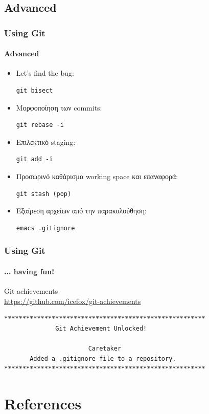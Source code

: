 \documentclass[]{beamer}
\begin{document}
\subsection{Advanced}

\begin{frame}[fragile]
  \frametitle{Using Git}
  \framesubtitle{Advanced}
  \begin{itemize}
    \item Let's find the bug:
\begin{verbatim}
git bisect
\end{verbatim}\pause
    \item Μορφοποίηση των commits:
\begin{verbatim}
git rebase -i
\end{verbatim}\pause
    \item Επιλεκτικό staging:
\begin{verbatim}
git add -i
\end{verbatim}\pause
    \item Προσωρινό καθάρισμα working space και επαναφορά:
\begin{verbatim}
git stash (pop)
\end{verbatim}\pause
    \item Εξαίρεση αρχείων από την παρακολούθηση:
\begin{verbatim}
emacs .gitignore
\end{verbatim}
  \end{itemize}
\end{frame}

\begin{frame}[fragile]
  \frametitle{Using Git}
  \framesubtitle{... having fun!}
  \begin{center}
  Git achievements \\
  \url{https://github.com/icefox/git-achievements}
\begin{verbatim}
*******************************************************
              Git Achievement Unlocked!

                       Caretaker
       Added a .gitignore file to a repository.
*******************************************************
\end{verbatim}
  \end{center}
\end{frame}

\section*{References}
\end{document}
